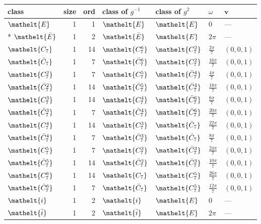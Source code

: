 \documentclass[10pt,a4paper]{article}
\numberwithin{equation}{section}
\newcommand{\eltfont}[1]{{\let\sigma\eltsigma\mathelt{#1}}}
\newcommand{\cls}[1]{\eltfont{#1}}
\newcommand{\dirvec}[3]{(#1, #2, #3)}
\newcommand{\vv}{\mathbf{v}}
\newcommand{\barred}[1]{\bar{#1}}
\begin{document}
{\renewcommand{\arraystretch}{1.3}\begin{longtable}{@{}lrrllll@{}}\toprule
class & size & ord & class of $g^{-1}$ & class of $g^{2}$ & $\omega$ & $\vv$\\\midrule\endhead
\bottomrule\endfoot\endlastfoot
$\cls{E}$ & 1 & 1 & $\cls{E}$ & $\cls{E}$ & $0$ & ---\\*
$\cls{\barred{E}}$ & 1 & 2 & $\cls{\barred{E}}$ & $\cls{E}$ & $2\pi$ & ---\\
$\cls{C_{7}}$ & 1 & 14 & $\cls{C_{7}^{6}}$ & $\cls{C_{7}^{2}}$ & $\tfrac{2\pi}{7}$ & $\dirvec{0}{0}{1}$\\
$\cls{\barred{C}_{7}}$ & 1 & 7 & $\cls{\barred{C}_{7}^{6}}$ & $\cls{C_{7}^{2}}$ & $\tfrac{16\pi}{7}$ & $\dirvec{0}{0}{1}$\\
$\cls{C_{7}^{2}}$ & 1 & 7 & $\cls{C_{7}^{5}}$ & $\cls{\barred{C}_{7}^{4}}$ & $\tfrac{4\pi}{7}$ & $\dirvec{0}{0}{1}$\\
$\cls{\barred{C}_{7}^{2}}$ & 1 & 14 & $\cls{\barred{C}_{7}^{5}}$ & $\cls{\barred{C}_{7}^{4}}$ & $\tfrac{18\pi}{7}$ & $\dirvec{0}{0}{1}$\\
$\cls{C_{7}^{3}}$ & 1 & 14 & $\cls{C_{7}^{4}}$ & $\cls{\barred{C}_{7}^{6}}$ & $\tfrac{6\pi}{7}$ & $\dirvec{0}{0}{1}$\\
$\cls{\barred{C}_{7}^{3}}$ & 1 & 7 & $\cls{\barred{C}_{7}^{4}}$ & $\cls{\barred{C}_{7}^{6}}$ & $\tfrac{20\pi}{7}$ & $\dirvec{0}{0}{1}$\\
$\cls{C_{7}^{4}}$ & 1 & 14 & $\cls{C_{7}^{3}}$ & $\cls{\barred{C}_{7}}$ & $\tfrac{22\pi}{7}$ & $\dirvec{0}{0}{1}$\\
$\cls{\barred{C}_{7}^{4}}$ & 1 & 7 & $\cls{\barred{C}_{7}^{3}}$ & $\cls{\barred{C}_{7}}$ & $\tfrac{8\pi}{7}$ & $\dirvec{0}{0}{1}$\\
$\cls{C_{7}^{5}}$ & 1 & 7 & $\cls{C_{7}^{2}}$ & $\cls{\barred{C}_{7}^{3}}$ & $\tfrac{24\pi}{7}$ & $\dirvec{0}{0}{1}$\\
$\cls{\barred{C}_{7}^{5}}$ & 1 & 14 & $\cls{\barred{C}_{7}^{2}}$ & $\cls{\barred{C}_{7}^{3}}$ & $\tfrac{10\pi}{7}$ & $\dirvec{0}{0}{1}$\\
$\cls{C_{7}^{6}}$ & 1 & 14 & $\cls{C_{7}}$ & $\cls{C_{7}^{5}}$ & $\tfrac{26\pi}{7}$ & $\dirvec{0}{0}{1}$\\
$\cls{\barred{C}_{7}^{6}}$ & 1 & 7 & $\cls{\barred{C}_{7}}$ & $\cls{C_{7}^{5}}$ & $\tfrac{12\pi}{7}$ & $\dirvec{0}{0}{1}$\\
$\cls{i}$ & 1 & 2 & $\cls{i}$ & $\cls{E}$ & $0$ & ---\\
$\cls{\barred{i}}$ & 1 & 2 & $\cls{\barred{i}}$ & $\cls{E}$ & $2\pi$ & ---\\

\end{longtable}}
\end{document}
